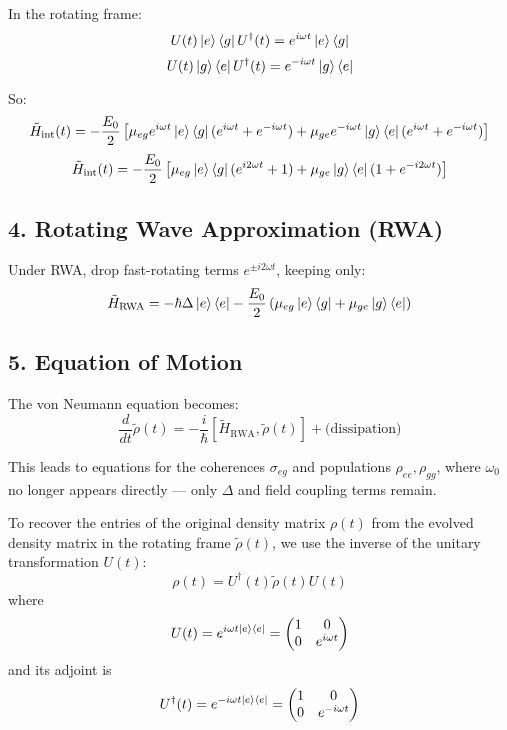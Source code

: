 In the rotating frame:
\[
	U(t) \ket{e}\bra{g} U^\dagger(t) = e^{i\omega t} \ket{e}\bra{g}
\]
\[
	U(t) \ket{g}\bra{e} U^\dagger(t) = e^{-i\omega t} \ket{g}\bra{e}
\]

So:
\[
	\tilde{H}_{\text{int}}(t) = -\frac{E_0}{2} \left[
		\mu_{eg} e^{i\omega t} \ket{e}\bra{g} (e^{i\omega t} + e^{-i\omega t}) + \mu_{ge} e^{-i\omega t} \ket{g}\bra{e} (e^{i\omega t} + e^{-i\omega t})
		\right]
\]
\[
	\tilde{H}_{\text{int}}(t) = -\frac{E_0}{2} \left[
		\mu_{eg} \ket{e}\bra{g} (e^{i2\omega t} + 1) + \mu_{ge} \ket{g}\bra{e} (1 + e^{-i2\omega t})
		\right]
\]

\subsection*{4. Rotating Wave Approximation (RWA)}

Under RWA, drop fast-rotating terms $e^{\pm i2\omega t}$, keeping only:
\[
	\tilde{H}_{\text{RWA}} = -\hbar \Delta \ket{e}\bra{e} - \frac{E_0}{2} \left(
	\mu_{eg} \ket{e}\bra{g} + \mu_{ge} \ket{g}\bra{e}
	\right)
\]

\subsection*{5. Equation of Motion}

The von Neumann equation becomes:
\[
	\frac{d}{dt} \tilde{\rho}(t) = -\frac{i}{\hbar} [\tilde{H}_{\text{RWA}}, \tilde{\rho}(t)] + \text{(dissipation)}
\]

This leads to equations for the coherences $\sigma_{eg}$ and populations $\rho_{ee}, \rho_{gg}$, where $\omega_0$ no longer appears directly — only $\Delta$ and field coupling terms remain.

To recover the entries of the original density matrix $\rho(t)$ from the evolved density matrix in the rotating frame $\tilde{\rho}(t)$, we use the inverse of the unitary transformation $U(t)$:
\[
	\rho(t) = U^\dagger(t) \tilde{\rho}(t) U(t)
\]
where
\[
	U(t) = e^{i \omega t \ket{e}\bra{e}} =
	\begin{pmatrix}
		1 & 0             \\
		0 & e^{i\omega t}
	\end{pmatrix}
\]
and its adjoint is
\[
	U^\dagger(t) = e^{-i \omega t \ket{e}\bra{e}} =
	\begin{pmatrix}
		1 & 0              \\
		0 & e^{-i\omega t}
	\end{pmatrix}
\]

